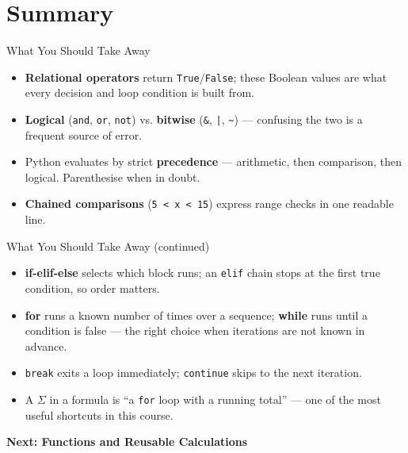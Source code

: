 \documentclass[9pt,aspectratio=169,xcolor=table]{beamer}
\begin{document}
\section{Summary}

\begin{frame}{What You Should Take Away}
    \leavevmode
    \small
    \begin{itemize}
        \item \textbf{Relational operators} return \texttt{True}/\texttt{False};
              these Boolean values are what every decision and loop
              condition is built from.
        \item \textbf{Logical} (\texttt{and}, \texttt{or}, \texttt{not})
              vs. \textbf{bitwise} (\texttt{\&}, \texttt{|},
              \texttt{\textasciitilde}) --- confusing the two is a
              frequent source of error.
        \item Python evaluates by strict \textbf{precedence} ---
              arithmetic, then comparison, then logical. Parenthesise
              when in doubt.
        \item \textbf{Chained comparisons} (\texttt{5 < x < 15}) express
              range checks in one readable line.
    \end{itemize}
\end{frame}

\begin{frame}{What You Should Take Away (continued)}
    \leavevmode
    \small
    \begin{itemize}
        \item \textbf{if-elif-else} selects which block runs; an
              \texttt{elif} chain stops at the first true condition, so
              order matters.
        \item \textbf{for} runs a known number of times over a sequence;
              \textbf{while} runs until a condition is false --- the
              right choice when iterations are not known in advance.
        \item \texttt{break} exits a loop immediately; \texttt{continue}
              skips to the next iteration.
        \item A $\Sigma$ in a formula is ``a \texttt{for} loop with a
              running total'' --- one of the most useful shortcuts in
              this course.
    \end{itemize}

    \vspace{4mm}
    \begin{center}
        \large\color{primary}\textbf{Next: Functions and Reusable Calculations}
    \end{center}
\end{frame}
\end{document}
